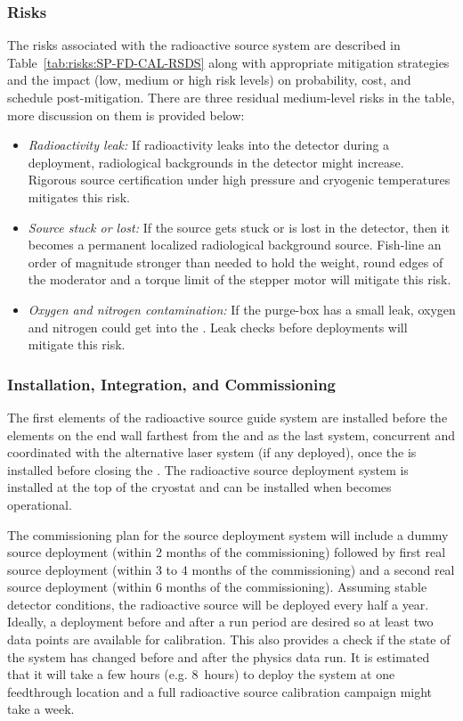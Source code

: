\subsubsection{Risks}
The risks associated with the radioactive source system are described in Table~\ref{tab:risks:SP-FD-CAL-RSDS} along with appropriate mitigation strategies and the impact (low, medium or high risk levels) on probability, cost, and schedule post-mitigation. There are three residual medium-level risks in the table, more discussion on them is provided below:
\begin{itemize}
    \item {\it Radioactivity leak:} If radioactivity leaks into the detector during a deployment, radiological backgrounds in the detector might increase. Rigorous source certification under high pressure and cryogenic temperatures mitigates this risk.
    \item {\it Source stuck or lost:} If the source gets stuck or is lost in the detector, then it becomes a permanent localized radiological background source. Fish-line an order of magnitude stronger than needed to hold the weight, round edges of the moderator and a torque limit of the stepper motor will mitigate this risk.
    \item {\it Oxygen and nitrogen contamination:} If the purge-box has a small leak, oxygen and nitrogen could get into the . Leak checks before deployments will mitigate this risk.
\end{itemize}





\subsubsection{Installation, Integration, and Commissioning}
The first elements of the radioactive source guide system are installed before the  elements on the end wall farthest from the  and as the last system, concurrent and coordinated with the alternative laser system (if any deployed), once the  is installed before closing the . The radioactive source deployment system is installed at the top of the cryostat and can be installed when  becomes operational.

The commissioning plan for the source deployment system will include a dummy source deployment (within \num{2} months of the commissioning) followed by first real source deployment (within \num{3} to \num{4} months of the commissioning) and a second real source deployment (within \num{6} months of the commissioning). Assuming stable detector conditions, the radioactive source will be deployed every half a year. Ideally, a deployment before and after a run period are desired so at least two data points are available for calibration. This also provides a check if the state of the system
has changed before and after the physics data run. 
It is estimated that it will take a few hours (e.g. \num{8}~hours) to deploy the system at one feedthrough location and a full radioactive source calibration campaign might take %
a week.

